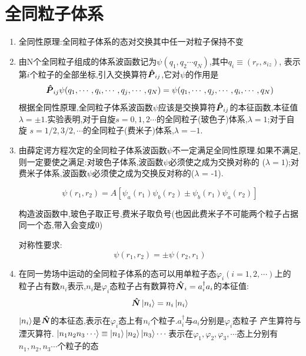\documentclass{article}
\begin{document}
    \section{全同粒子体系}

        \begin{formal}
        \begin{enumerate}
            \item 全同性原理:全同粒子体系的态对交换其中任一对粒子保持不变
            \item 由N个全同粒子组成的体系波函数记为$\psi(q_{1},q_{2}\cdots q_{N})$,其中$q_{i} \equiv (r_{r},s_{iz})$,
                  表示第$i$个粒子的全部坐标,引入交换算符$\vu*{P}_{ij}$,它对$\psi$的作用是
                  $$
                  \vu*{P}_{ij} \psi(q_{1},\cdots,q_{i},\cdots,q_{j},\cdots,q_{N}) = \psi(q_{1},\cdots,q_{j},\cdots,q_{i},\cdots,q_{N})
                  $$
                  根据全同性原理,全同粒子体系波函数$\psi$应该是交换算符$\vu*{P}_{ij}$的本征函数,本征值
                  $\lambda=\pm 1$.实验表明,对于自旋$s=0,1,2\cdots$的全同粒子(玻色子)体系,$\lambda=1$;对于自旋
                  $s = 1/2,3/2,\cdots$的全同粒子(费米子)体系,$\lambda=-1$.

            \item 由薛定谔方程次定的全同粒子体系波函数$\psi$不一定满足全同性原理.如果不满足,则一定要使之满足:对玻色子体系,波函数$\psi$必须使之成为交换对称的
                  ($\lambda=1$);对费米子体系,波函数$\psi$必须使之成为交换反对称的($\lambda$ = -1).

                  $$
                  \psi(r_{1},r_{2}) = A [ \psi_{a}(r_{1}) \psi_{b}(r_{2}) \pm \psi_{b}(r_{1}) \psi_{a}(r_{2}) ]
                  $$

                  构造波函数中,玻色子取正号,费米子取负号(也因此费米子不可能两个粒子占据同一个态,带入会变成0)

                  对称性要求:
                  $$
                  \psi(r_{1},r_{2}) = \pm \psi(r_{2},r_{1})
                  $$
                  

            \item 在同一势场中运动的全同粒子体系的态可以用单粒子态$\varphi_{i}(i=1,2,\cdots)$上的
                  粒子占有数$n_{i}$表示,$n_{i}$是$\varphi_{i}$态粒子占有数算符$\vu*{N}_{i}=a^{\dagger}_{i}a_{i}$的本征值:
                  $$ \vu*{N}\ket{n_{i}} = n_{i} \ket{n_{i}} $$
                  $\ket{n_{i}}$是$\vu*{N}$的本征态,表示在$\varphi_{i}$态上有$n_{i}$个粒子.$a_{i}^{\dagger}$与$a_{i}$分别是$\varphi_{i}$态粒子
                  产生算符与湮灭算符. $ \ket{n_{1}n_{2}n_{3}\cdots} \equiv \ket{n_{1}} \ket{n_{2}} \ket{n_{3}} \cdots 
                  $表示在$\varphi_{1},\varphi_{2},\varphi_{3},\cdots$态上分别有$n_{1},n_{2},n_{3} \cdots$个粒子的态  
                  

\end{enumerate}
\end{formal}
\end{document}
